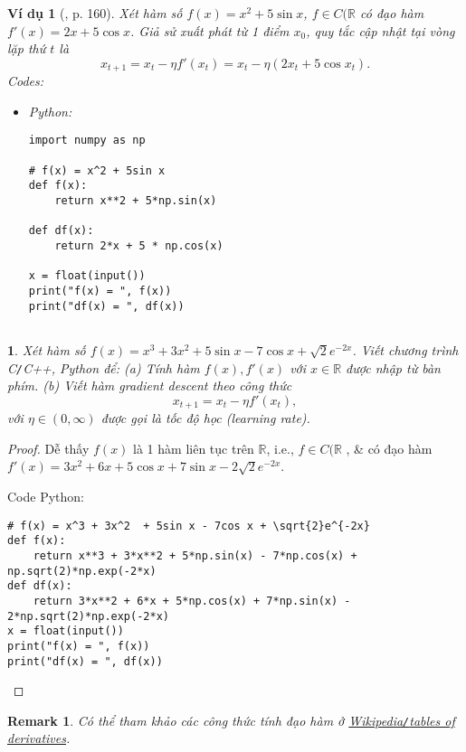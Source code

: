 \documentclass{article}
\newtheorem{baitoan}{}
\newtheorem{remark}{Remark}
\newtheorem{vidu}{Ví dụ}
\begin{document}
\begin{vidu}[\cite{Tiep_ML_co_ban}, p. 160]
	Xét hàm số $f(x) = x^2 + 5\sin x$, $f\in C(\mathbb{R}$ có đạo hàm $f'(x) = 2x + 5\cos x$. Giả sử xuất phát từ 1 điểm $x_0$, quy tắc cập nhật tại vòng lặp thứ $t$ là
	\begin{equation*}
		x_{t+1} = x_t - \eta f'(x_t) = x_t - \eta(2x_t + 5\cos x_t).
	\end{equation*}
	Codes:
	\begin{itemize}
		\item Python:
		\begin{verbatim}
import numpy as np

# f(x) = x^2 + 5sin x
def f(x):
    return x**2 + 5*np.sin(x)

def df(x):
    return 2*x + 5 * np.cos(x)

x = float(input())
print("f(x) = ", f(x))
print("df(x) = ", df(x))


		\end{verbatim}
	\end{itemize}
\end{vidu}

\begin{baitoan}
	Xét hàm số $f(x) = x^3 + 3x^2 + 5\sin x - 7\cos x + \sqrt{2}e^{-2x}$. Viết chương trình {\sf C{\tt/}C++, Python} để: (a) Tính hàm $f(x),f'(x)$ với $x\in\mathbb{R}$ được nhập từ bàn phím. (b) Viết hàm gradient descent theo công thức
	\begin{equation*}
		x_{t+1} = x_t - \eta f'(x_t),
	\end{equation*}
	với $\eta\in(0,\infty)$ được gọi là {\rm tốc độ học (learning rate)}.
\end{baitoan}

\begin{proof}
	Dễ thấy $f(x)$ là 1 hàm liên tục trên $\mathbb{R}$, i.e., $f\in C(\mathbb{R}$ , \& có đạo hàm $f'(x) = 3x^2 + 6x + 5\cos x + 7\sin x - 2\sqrt{2}e^{-2x}$.
	
	Code Python:
	\begin{verbatim}
# f(x) = x^3 + 3x^2  + 5sin x - 7cos x + \sqrt{2}e^{-2x}
def f(x):
    return x**3 + 3*x**2 + 5*np.sin(x) - 7*np.cos(x) + np.sqrt(2)*np.exp(-2*x)
def df(x):
    return 3*x**2 + 6*x + 5*np.cos(x) + 7*np.sin(x) - 2*np.sqrt(2)*np.exp(-2*x)
x = float(input())
print("f(x) = ", f(x))
print("df(x) = ", df(x))
	\end{verbatim}
\end{proof}

\begin{remark}
	Có thể tham khảo các công thức tính đạo hàm ở \href{https://en.wikibooks.org/wiki/Calculus/Tables_of_Derivatives}{Wikipedia{\tt/}tables of derivatives}.
\end{remark}
\end{document}
